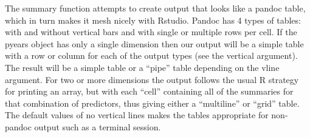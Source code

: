 \documentclass{article}
\begin{document}
The summary function attempts to create output that looks like a 
pandoc table, which in turn makes it mesh nicely with Rstudio.
Pandoc has 4 types of tables: with and without vertical bars and
with single or multiple rows per cell. 
If the pyears object has only a single dimension then our output will
be a simple table with a row or column for each of the output
types (see the vertical argument).
The result will be a simple table or a ``pipe'' table depending on the
vline argument.
For two or more dimensions the output follows the usual R strategy for printing
an array, but with each ``cell'' containing all of the summaries for that
combination of predictors, thus giving  
either a ``multiline'' or ``grid'' table.
The default values of no vertical lines makes the tables
appropriate for non-pandoc output such as a terminal session.
\end{document}

